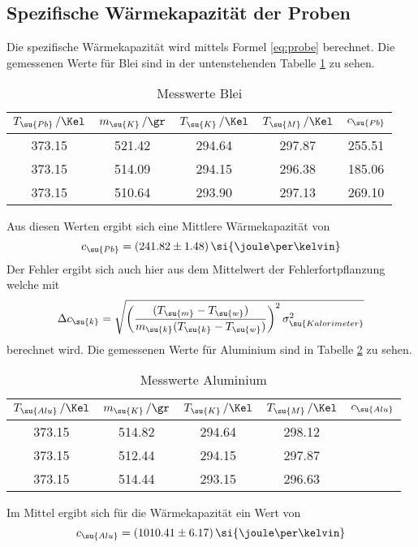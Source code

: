 \subsection{Spezifische Wärmekapazität der Proben}
Die spezifische Wärmekapazität wird mittels Formel \eqref{eq:probe} berechnet.
Die gemessenen Werte für Blei sind in der untenstehenden Tabelle \ref{tab:pb}
zu sehen.
\begin{table}
  \centering
  \begin{tabular}{c c c c c}
    \toprule
    $T_\su{Pb}\,/\Kel$ & $m_\su{K}\,/\gr$ & $T_\su{K}\,/\Kel
    $ & $T_\su{M}\,/\Kel$ & $c_\su{Pb}$\\
    \midrule
    373.15 & 521.42 & 294.64 & 297.87 & 255.51 \\
    373.15 & 514.09 & 294.15 & 296.38 & 185.06 \\
    373.15 & 510.64 & 293.90 & 297.13 & 269.10 \\
    \bottomrule
  \end{tabular}
  \caption{Messwerte Blei}
  \label{tab:pb}
\end{table}
Aus diesen Werten ergibt sich eine Mittlere Wärmekapazität von
\begin{equation*}
  c_\su{Pb}=(241.82\pm1.48)\,\si{\joule\per\kelvin}
\end{equation*}
Der Fehler ergibt sich auch hier aus dem Mittelwert der Fehlerfortpflanzung
welche mit
\begin{equation}
  \Delta c_\su{k} = \sqrt{\left(\frac{(T_\su{m}-T_\su{w})}{m_\su{k}
  (T_\su{k}-T_\su{w})}\right)^2\sigma_\su{Kalorimeter}^2}
  \label{eq:gauss}
\end{equation}
berechnet wird.
Die gemessenen Werte für Aluminium sind in Tabelle \ref{tab:alu} zu sehen.
\begin{table}
  \centering
  \begin{tabular}{c c c c c}
    \toprule
    $T_\su{Alu}\,/\Kel$ & $m_\su{K}\,/\gr$ & $T_\su{K}\,/\Kel
    $ & $T_\su{M}\,/\Kel$ & $c_\su{Alu}$\\
    \midrule
    373.15 & 514.82 & 294.64 & 298.12 & \\
    373.15 & 512.44 & 294.15 & 297.87 & \\
    373.15 & 514.44 & 293.15 & 296.63 & \\
    \bottomrule
  \end{tabular}
  \caption{Messwerte Aluminium}
  \label{tab:alu}
\end{table}
Im Mittel ergibt sich für die Wärmekapazität ein Wert von
\begin{equation*}
  c_\su{Alu}=(1010.41\pm6.17)\,\si{\joule\per\kelvin}
\end{equation*}

